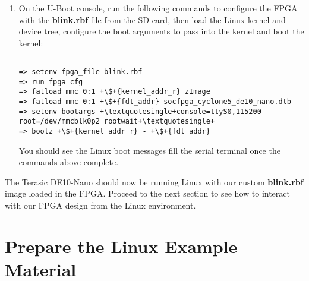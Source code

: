 \begin{flushleft}
\begin{enumerate}[
	label=\textbf{Step \arabic*.},
	leftmargin=*,
	widest={00},
	align=left]
\begin{verbatim}
In:    serial
Out:   serial
Err:   serial
Model: Terasic DE10-Nano
Net:
Error: ethernet@ff702000 address not set.
No ethernet found.
Hit any key to stop autoboot:  0
=>

\end{verbatim}

\item On the U-Boot console, run the following commands to configure the FPGA with the \textbf{blink.rbf} file from the SD card, then load the Linux kernel and device tree, configure the boot arguments to pass into the kernel and boot the kernel:

\begin{verbatim}

=> setenv fpga_file blink.rbf
=> run fpga_cfg
=> fatload mmc 0:1 +\$+{kernel_addr_r} zImage
=> fatload mmc 0:1 +\$+{fdt_addr} socfpga_cyclone5_de10_nano.dtb
=> setenv bootargs +\textquotesingle+console=ttyS0,115200 root=/dev/mmcblk0p2 rootwait+\textquotesingle+
=> bootz +\$+{kernel_addr_r} - +\$+{fdt_addr}

\end{verbatim}

You should see the Linux boot messages fill the serial terminal once the commands above complete.

\end{enumerate}

The Terasic DE10-Nano should now be running Linux with our custom \textbf{blink.rbf} image loaded in the FPGA.  Proceed to the next section to see how to interact with our FPGA design from the Linux environment.

\end{flushleft}

\section*{Prepare the Linux Example Material}

